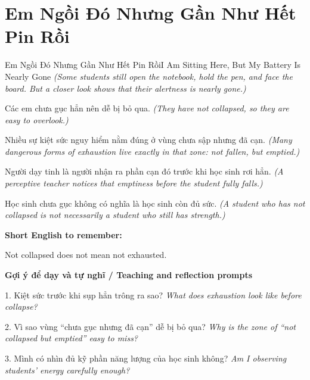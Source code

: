 \section{Em Ngồi Đó Nhưng Gần Như Hết Pin Rồi}
\begin{truyen}{Em Ngồi Đó Nhưng Gần Như Hết Pin Rồi}{I Am Sitting Here, But My Battery Is Nearly Gone}
\textit{(Some students still open the notebook, hold the pen, and face the board. But a closer look shows that their alertness is nearly gone.)}

Các em chưa gục hẳn nên dễ bị bỏ qua.
\textit{(They have not collapsed, so they are easy to overlook.)}

Nhiều sự kiệt sức nguy hiểm nằm đúng ở vùng chưa sập nhưng đã cạn.
\textit{(Many dangerous forms of exhaustion live exactly in that zone: not fallen, but emptied.)}

Người dạy tinh là người nhận ra phần cạn đó trước khi học sinh rơi hẳn.
\textit{(A perceptive teacher notices that emptiness before the student fully falls.)}

\end{truyen}

\begin{baihoc}
Học sinh chưa gục không có nghĩa là học sinh còn đủ sức.
\textit{(A student who has not collapsed is not necessarily a student who still has strength.)}
\end{baihoc}

\begin{ghinhoanh}
\textbf{Short English to remember:}

Not collapsed does not mean not exhausted.

\end{ghinhoanh}

\begin{tuhocnhanh}
\textbf{Gợi ý để dạy và tự nghĩ / Teaching and reflection prompts}

1. Kiệt sức trước khi sụp hẳn trông ra sao? \textit{What does exhaustion look like before collapse?}

2. Vì sao vùng “chưa gục nhưng đã cạn” dễ bị bỏ qua? \textit{Why is the zone of “not collapsed but emptied” easy to miss?}

3. Mình có nhìn đủ kỹ phần năng lượng của học sinh không? \textit{Am I observing students' energy carefully enough?}
\end{tuhocnhanh}
\ngancach

